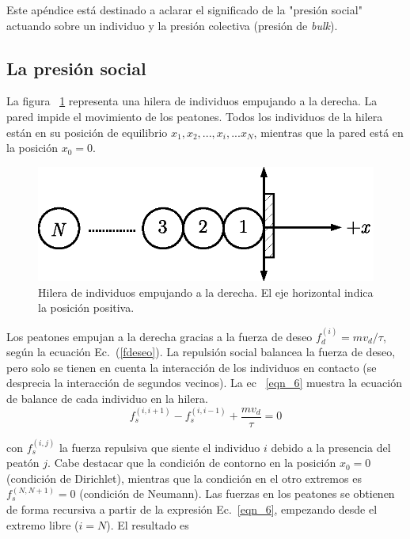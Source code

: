\label{appendix:presion}

Este apéndice está destinado a aclarar el significado de la "presión social" actuando sobre un individuo y la presión colectiva (presión de \textit{bulk}).  
\\
\subsection{\label{social_pressure}La presión social}

La figura ~\ref{hilera2} representa una hilera de individuos empujando a la derecha. La pared impide el movimiento de los peatones. Todos los individuos de la hilera están en su posición de equilibrio $x_1,x_2,...,x_{i},...x_N$, mientras que la pared está en la posición $x_0=0$. 

\begin{figure}[!htbp]
\center
\includegraphics[scale=1]{figuras/hilera.eps}
\caption{\label{hilera2} Hilera de individuos empujando a la derecha. El eje horizontal indica la posición positiva. }
\end{figure}

Los peatones empujan a la derecha gracias a la fuerza de deseo
$f_d^{(i)}=mv_d/\tau$, según la ecuación Ec.~(\ref{fdeseo}). La repulsión social balancea la fuerza de deseo, pero solo se tienen en cuenta la interacción de los individuos en contacto (se desprecia la interacción de segundos vecinos). La ec ~\ref{eqn_6} muestra la ecuación de balance de cada individuo en la hilera. \\

\begin{equation}
 f_s^{(i,i+1)}-f_s^{(i,i-1)}+\displaystyle\frac{mv_d}{\tau}=0\label{eqn_6}
\end{equation}

\noindent con $f_s^{(i,j)}$ la fuerza repulsiva que siente el individuo $i$ debido a la presencia del peatón $j$. Cabe destacar que la condición de contorno en la posición $x_0=0$ (condición de Dirichlet), mientras que la condición en el otro extremos es $f_s^{(N,N+1)}=0$ (condición de Neumann). Las fuerzas en los peatones se obtienen de forma recursiva a partir de la expresión Ec.~\ref{eqn_6}, empezando desde el extremo libre ($i=N$). El resultado es

